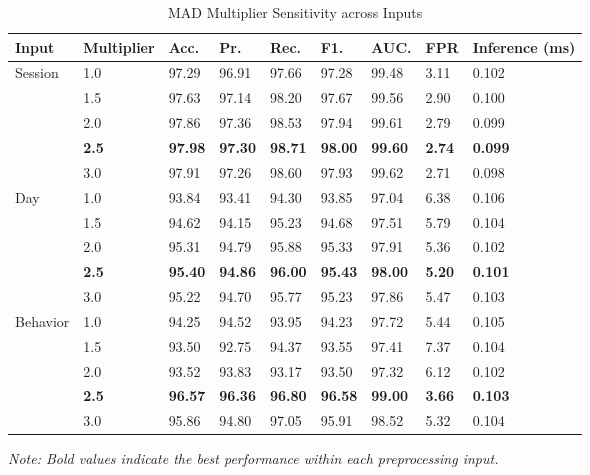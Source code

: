 \begin{table}[!ht]
\centering
\caption{MAD Multiplier Sensitivity across Inputs}
\label{tab:mad_sensitivity_all}
\renewcommand{\arraystretch}{1.3} %
\setlength{\tabcolsep}{5pt}      %
\small
\begin{tabular}{|l|l|l|l|l|l|l|l|l|}
\hline
\textbf{Input} & \textbf{Multiplier} & \textbf{Acc.} & \textbf{Pr.} & \textbf{Rec.} & \textbf{F1.} & \textbf{AUC.} & \textbf{FPR} & \textbf{Inference (ms)} \\
\hline

\multirow{5}{*}{Session}  
 & 1.0 & 97.29 & 96.91 & 97.66 & 97.28 & 99.48 & 3.11 & 0.102 \\ \cline{2-9}
 & 1.5 & 97.63 & 97.14 & 98.20 & 97.67 & 99.56 & 2.90 & 0.100 \\ \cline{2-9}
 & 2.0 & 97.86 & 97.36 & 98.53 & 97.94 & 99.61 & 2.79 & 0.099 \\ \cline{2-9}
 & \textbf{2.5} & \textbf{97.98} & \textbf{97.30} & \textbf{98.71} & \textbf{98.00} & \textbf{99.60} & \textbf{2.74} & \textbf{0.099} \\ \cline{2-9}
 & 3.0 & 97.91 & 97.26 & 98.60 & 97.93 & 99.62 & 2.71 & 0.098 \\ 
\hline

\multirow{5}{*}{Day}  
 & 1.0 & 93.84 & 93.41 & 94.30 & 93.85 & 97.04 & 6.38 & 0.106 \\ \cline{2-9}
 & 1.5 & 94.62 & 94.15 & 95.23 & 94.68 & 97.51 & 5.79 & 0.104 \\ \cline{2-9}
 & 2.0 & 95.31 & 94.79 & 95.88 & 95.33 & 97.91 & 5.36 & 0.102 \\ \cline{2-9}
 & \textbf{2.5} & \textbf{95.40} & \textbf{94.86} & \textbf{96.00} & \textbf{95.43} & \textbf{98.00} & \textbf{5.20} & \textbf{0.101} \\ \cline{2-9}
 & 3.0 & 95.22 & 94.70 & 95.77 & 95.23 & 97.86 & 5.47 & 0.103 \\
\hline

\multirow{5}{*}{Behavior}  
 & 1.0 & 94.25 & 94.52 & 93.95 & 94.23 & 97.72 & 5.44 & 0.105 \\ \cline{2-9}
 & 1.5 & 93.50 & 92.75 & 94.37 & 93.55 & 97.41 & 7.37 & 0.104 \\ \cline{2-9}
 & 2.0 & 93.52 & 93.83 & 93.17 & 93.50 & 97.32 & 6.12 & 0.102 \\ \cline{2-9}
 & \textbf{2.5} & \textbf{96.57} & \textbf{96.36} & \textbf{96.80} & \textbf{96.58} & \textbf{99.00} & \textbf{3.66} & \textbf{0.103} \\ \cline{2-9}
 & 3.0 & 95.86 & 94.80 & 97.05 & 95.91 & 98.52 & 5.32 & 0.104 \\
\hline
\end{tabular}

\vspace{2mm}
\scriptsize{\textit{Note: Bold values indicate the best performance within each preprocessing input.}}
\end{table}

